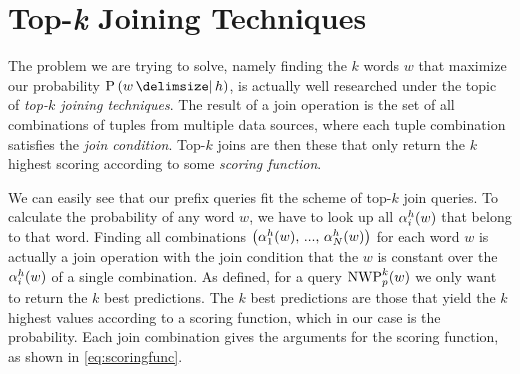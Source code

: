 \iffalse
Our approach to avoid enumerating all possible values for $w$ to find the $k$
words that maximize $\Prob{w}{h}$ relies on the fact that the probabilities are
\emph{monotone}, as was shown in \textbf{??}.
\todo{Actually show monotony somewhere in \cref{ch:weightedsum}.}
Monotone in our context means that higher $\SumArg^h_i(w)$ values correspond
to higher probabilities.
Our idea is now to always calculate the probability for the next remaining $w$
with the highest $\SumArg^h_i(w)$.
This is repeated until we are sure to have found the $k$ words $w$ with the
highest probability.
\fi

\section{Top-\emph{k} Joining Techniques}
\label{sec:topkjoin}

\iffalse
\begin{lstlisting}[
  label = {lst:topksql},
  float,
  caption = {\todo[inline]{Example SQL-Request Caption}},
  language = SQL,
  %basicstyle = \ttfamily,
  emph = {history1, historyN},
  emphstyle = \textit,
  deletekeywords = {count} % Used as column name, don't want to escape it though
]
  SELECT
    word,
    s(Trie1.alpha, ..., TrieN.alpha) AS probability
  FROM Vocabulary
  LEFT OUTER JOIN Trie1
    ON history1 + word = Trie1.sequence
  ...
  LEFT OUTER JOIN TrieN
    ON historyN + word = TrieN.sequence
  ORDER BY probability DESC
  LIMIT k;
\end{lstlisting}
\fi

The problem we are trying to solve, namely finding the $k$ words $w$ that
maximize our probability $\Prob{w}{h}$, is actually well researched under the
topic of \emph{top-$k$ joining techniques}.
The result of a join operation is the set of all combinations of tuples from
multiple data sources, where each tuple combination satisfies the \emph{join
condition}.
Top-$k$ joins are then these that only return the $k$ highest scoring
according to some \emph{scoring function}.

We can easily see that our prefix queries fit the scheme of top-$k$ join
queries.
To calculate the probability of any word $w$, we have to look up all
$\SumArg^h_i(w)$ that belong to that word.
Finding all combinations
$\left(\alpha^h_1(w), \, ..., \, \alpha^h_N(w)\right)$
for each word $w$ is actually a join operation with the join condition that
the $w$ is constant over the $\SumArg^h_i(w)$ of a single combination.
As defined, for a query $\NWP[p][k]{w}$ we only want to return the $k$ best
predictions.
The $k$ best predictions are those that yield the $k$ highest values according
to a scoring function, which in our case is the probability.
Each join combination gives the arguments for the scoring function, as shown
in \cref{eq:scoringfunc}.

